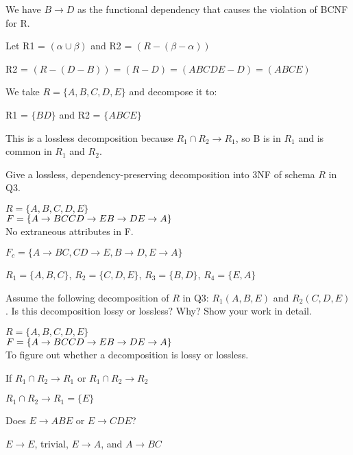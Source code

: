 \documentclass[a4 paper]{article}
\begin{document}
We have $B \rightarrow D$ as the functional dependency that causes the violation of BCNF for R.

Let R1 = $(\alpha \cup \beta)$ and R2 = $(R - (\beta - \alpha))$

R2 = $(R - (D - B)) = (R - D) = (ABCDE - D) = (ABCE)$

We take $R = \{A, B, C, D, E\}$ and decompose it to:

R1 = $\{BD\}$ and R2 = $\{ABCE\}$

This is a lossless decomposition because $R_1 \cap R_2 \rightarrow R_1$, so B is in $R_1$ and is common in $R_1$ and $R_2$.

Give a lossless, dependency-preserving decomposition into 3NF of schema $R$ in Q3.

$R = \{A, B, C, D, E\}$ \\$F = \{
\\A \rightarrow BC\\
CD \rightarrow E\\
B \rightarrow D\\
E \rightarrow A\}$\\

No extraneous attributes in F.

$F_c = \{A \rightarrow BC, CD \rightarrow E, B \rightarrow D, E \rightarrow A\}$

$R_1 = \{A,B,C\}$, $R_2 = \{C,D,E\}$, $R_3 = \{B,D\}$, $R_4 = \{E,A\}$

Assume the following decomposition of $R$ in Q3: $R_{1}(A, B, E)$ and $R_{2}(C, D, E)$. Is this decomposition lossy or lossless? Why? Show your work in detail.

$R = \{A, B, C, D, E\}$ \\$F = \{
\\A \rightarrow BC\\
CD \rightarrow E\\
B \rightarrow D\\
E \rightarrow A\}$\\

To figure out whether a decomposition is lossy or lossless. 

If $R_1 \cap R_2 \rightarrow R_1$ or $R_1 \cap R_2 \rightarrow R_2$

$R_1 \cap R_2 \rightarrow R_1 = \{E\}$

Does $E \rightarrow ABE$ or $E \rightarrow CDE$?

$E \rightarrow E$, trivial, $E \rightarrow A$, and $A \rightarrow BC$
\end{document}
